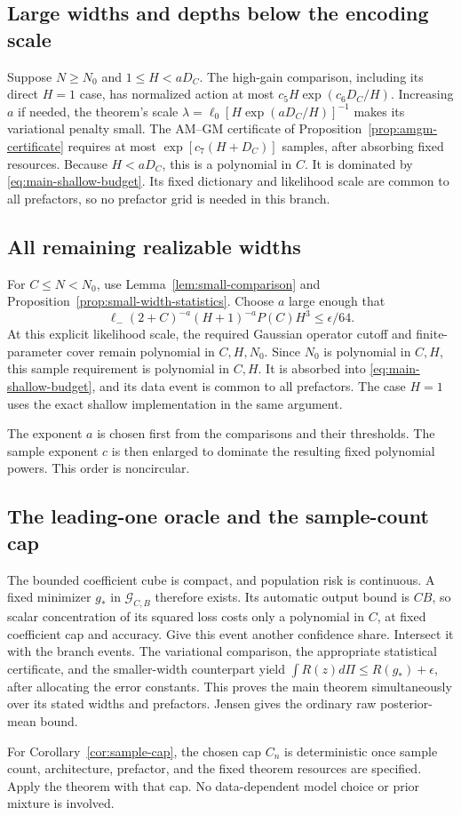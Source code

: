 \subsection{Large widths and depths below the encoding scale}
Suppose $N\ge N_0$ and $1\le H<aD_C$. The high-gain comparison, including its direct $H=1$ case, has normalized action at most
$c_5H\exp(c_6D_C/H)$. Increasing $a$ if needed, the theorem's scale
$\lambda=\ell_0[H\exp(aD_C/H)]^{-1}$ makes its variational penalty small. The AM--GM certificate of Proposition~\ref{prop:amgm-certificate} requires at most
$\exp[c_7(H+D_C)]$ samples, after absorbing fixed resources. Because $H<aD_C$, this is a polynomial in $C$. It is dominated by \eqref{eq:main-shallow-budget}. Its fixed dictionary and likelihood scale are common to all prefactors, so no prefactor grid is needed in this branch.

\subsection{All remaining realizable widths}
For $C\le N<N_0$, use Lemma~\ref{lem:small-comparison} and Proposition~\ref{prop:small-width-statistics}. Choose $a$ large enough that
\[
 \ell_-(2+C)^{-a}(H+1)^{-a}P(C)H^3\le\epsilon/64.
\]
At this explicit likelihood scale, the required Gaussian operator cutoff and finite-parameter cover remain polynomial in $C,H,N_0$. Since $N_0$ is polynomial in $C,H$, this sample requirement is polynomial in $C,H$. It is absorbed into \eqref{eq:main-shallow-budget}, and its data event is common to all prefactors. The case $H=1$ uses the exact shallow implementation in the same argument.

The exponent $a$ is chosen first from the comparisons and their thresholds. The sample exponent $c$ is then enlarged to dominate the resulting fixed polynomial powers. This order is noncircular.

\subsection{The leading-one oracle and the sample-count cap}
The bounded coefficient cube is compact, and population risk is continuous. A fixed minimizer $g_*$ in $\mathcal G_{C,B}$ therefore exists. Its automatic output bound is $CB$, so scalar concentration of its squared loss costs only a polynomial in $C$, at fixed coefficient cap and accuracy. Give this event another confidence share. Intersect it with the branch events. The variational comparison, the appropriate statistical certificate, and the smaller-width counterpart yield
$\int R(z)d\Pi\le R(g_*)+\epsilon$, after allocating the error constants. This proves the main theorem simultaneously over its stated widths and prefactors. Jensen gives the ordinary raw posterior-mean bound.

For Corollary~\ref{cor:sample-cap}, the chosen cap $C_n$ is deterministic once sample count, architecture, prefactor, and the fixed theorem resources are specified. Apply the theorem with that cap. No data-dependent model choice or prior mixture is involved.
